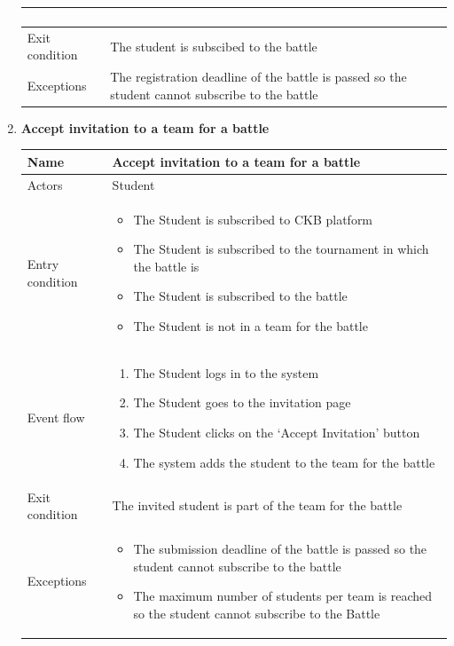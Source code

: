 \begin{enumerate}[label=UC\arabic*:]
\begin{tabular}{|p{3cm}|p{8cm}|}
\begin{enumerate}[label=\arabic*.]
        \end{enumerate} \\
        \hline
        Exit condition & The student is subscibed to the battle \\
        \hline
        Exceptions & The registration deadline of the battle is passed so the student cannot subscribe to the battle \\
        \hline
    \end{tabular}
    \item \textbf{Accept invitation to a team for a battle} \\
    \begin{tabular}{|p{3cm}|p{8cm}|}
        \hline
        Name & Accept invitation to a team for a battle \\
        \hline
        Actors & Student \\
        \hline
        Entry condition &
        \begin{itemize}
            \item The Student is subscribed to CKB platform
            \item The Student is subscribed to the tournament in which the battle is
            \item The Student is subscribed to the battle
            \item The Student is not in a team for the battle
        \end{itemize} \\
        \hline
        Event flow &
        \begin{enumerate}[label=\arabic*.]
            \item The Student logs in to the system
            \item The Student goes to the invitation page
            \item The Student clicks on the `Accept Invitation' button
            \item The system adds the student to the team for the battle
        \end{enumerate} \\
        \hline
        Exit condition & The invited student is part of the team for the battle \\
        \hline
        Exceptions &
        \begin{itemize}
            \item The submission deadline of the battle is passed so the student cannot subscribe to the battle
            \item The maximum number of students per team is reached so the student cannot subscribe to the Battle

\end{itemize}
\end{tabular}
\end{enumerate}
